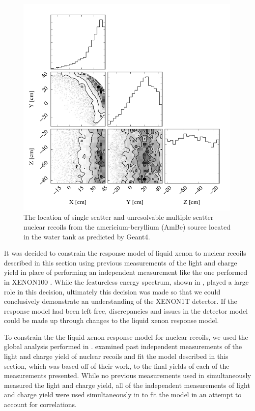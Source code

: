 \begin{figure}[t]
        \centering
	\includegraphics[width=0.99\textwidth]{xe1t_nr_positions}
	\caption{The location of single scatter and unresolvable multiple scatter nuclear recoils from the americium-beryllium (AmBe) source located in the water tank as predicted by Geant4.}
	\label{fig:xe1t_nr_positions}
\end{figure}


It was decided to constrain the response model of liquid xenon to nuclear recoils described in this section using previous measurements of the light and charge yield in place of performing an independent measurement like the one performed in XENON100 \cite{aprile2013response}.  While the featureless energy spectrum, shown in , played a large role in this decision, ultimately this decision was made so that we could conclusively demonstrate an understanding of the XENON1T detector.  If the response model had been left free, discrepancies and issues in the detector model could be made up through changes to the liquid xenon response model.  

To constrain the the liquid xenon response model for nuclear recoils, we used the global analysis performed in .   examined past independent measurements of the light and charge yield of nuclear recoils and fit the model described in this section, which was based off of their work, to the final yields of each of the measurements presented.  While no previous measurements used in  simultaneously measured the light and charge yield, all of the independent measurements of light and charge yield were used simultaneously in  to fit the model in an attempt to account for correlations.  

